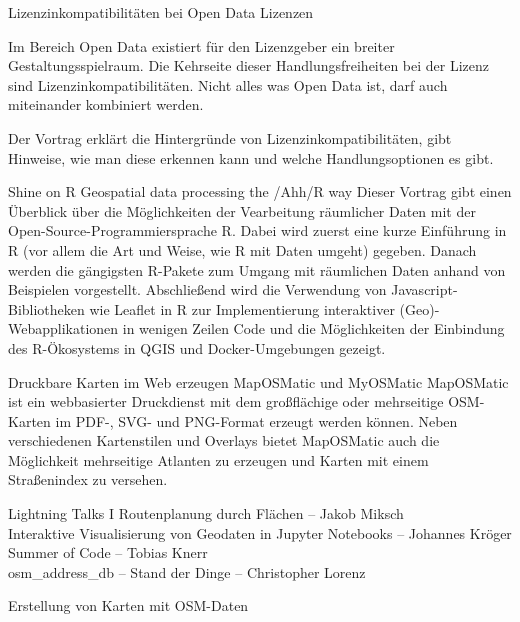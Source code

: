 %
{Lizenzinkompatibilitäten bei Open Data Lizenzen}%
{}%
{Im Bereich Open Data existiert für den Lizenzgeber ein breiter Gestaltungsspielraum. Die Kehrseite
  dieser Handlungsfreiheiten bei der Lizenz sind Lizenzinkompatibilitäten. Nicht alles was Open Data
  ist, darf auch miteinander kombiniert werden.

Der Vortrag erklärt die Hintergründe von Lizenzinkompatibilitäten, gibt Hinweise, wie man diese
erkennen kann und welche Handlungsoptionen es gibt.}

%
{Shine on R}%
{Geospatial data processing the /Ahh/R way}%
{Dieser Vortrag gibt einen Überblick über die Möglichkeiten der Vearbeitung räumlicher Daten mit der
  Open-Source-Programmiersprache R. Dabei wird zuerst eine kurze Einführung in R (vor allem die Art
  und Weise, wie R mit Daten umgeht) gegeben. Danach werden die gängigsten R-Pakete zum Umgang mit
  räumlichen Daten anhand von Beispielen vorgestellt. Abschließend wird die Verwendung von
  Javascript-Bibliotheken wie Leaflet in R zur Implementierung interaktiver (Geo)-Webapplikationen
  in wenigen Zeilen Code und die Möglichkeiten der Einbindung des R-Ökosystems in QGIS und
  Docker-Umgebungen gezeigt.}

%
{Druckbare Karten im Web erzeugen}%
{MapOSMatic und MyOSMatic}%
{%
  MapOSMatic ist ein webbasierter Druckdienst mit dem großflächige oder mehrseitige OSM-Karten im
  PDF-, SVG- und PNG-Format erzeugt werden können. Neben verschiedenen Kartenstilen und Overlays
  bietet MapOSMatic auch die Möglichkeit mehrseitige Atlanten zu erzeugen und Karten mit einem
  Straßenindex zu versehen.
}

\abstractNeun{}%
{Lightning Talks I}%
{}%
{Routenplanung durch Flächen -- Jakob Miksch\\
Interaktive Visualisierung von Geodaten in Jupyter Notebooks -- Johannes Kröger\\
Summer of Code -- Tobias Knerr\\
osm\_address\_db -- Stand der Dinge -- Christopher Lorenz}

%
{Erstellung von Karten mit OSM-Daten}%
{}%
{}


\newpage
{}

\vspace{4\baselineskip}\newline
\enlargethispage{1\baselineskip}
\newpage %
